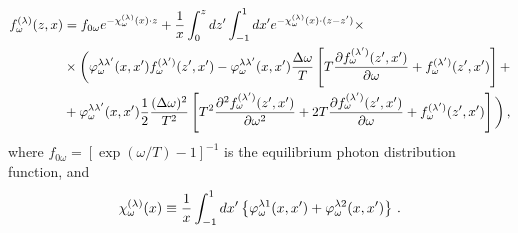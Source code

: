 \documentclass[
aps,%
12pt,%
final,%
notitlepage,%
oneside,%
onecolumn,%
nobibnotes,%
nofootinbib,%
superscriptaddress,%
noshowpacs,%
centertags]%
{revtex4}
\begin{document}
\begin{equation}\label{FormSol}
\begin{aligned}
f_\omega^{(\lambda)}(z,x)&=f_{0\omega} 	e^{-{\cal \chi}_\omega^{(\lambda)}(x)\cdot z} + \frac{1}{x}\int_{0}^{z}dz'\int_{-1}^{1}dx' e^{-{\cal \chi}_\omega^{(\lambda)}(x)\cdot (z-z')}\times
\\
&\times\bigg(\varphi_\omega^{\lambda 	\lambda'}(x,x')f_\omega^{(\lambda')}(z',x')- \varphi_\omega^{\lambda 	\lambda'}(x,x')\frac{\Delta \omega}{T}
\left[
T \frac{\partial f_\omega^{(\lambda')}(z',x')}{\partial \omega} + f_\omega^{(\lambda')}(z',x')
\right]+
\\
&+ \varphi_\omega^{\lambda 	\lambda'}(x,x')\frac{1}{2}\frac{(\Delta \omega)^2}{T^2}
\left[
T^2 \frac{\partial^2 f_\omega^{(\lambda')}(z',x')}{\partial \omega^2} + 2T \frac{\partial f_\omega^{(\lambda')}(z',x')}{\partial \omega}+f_\omega^{(\lambda')}(z',x')
\right]\bigg)\, ,
\end{aligned}	
\end{equation}
where $f_{0\omega}=[\exp(\omega/T)-1]^{-1}$ is the equilibrium photon distribution function, and
\begin{equation}
{\cal \chi}_\omega^{(\lambda)}(x) \equiv \frac{1}{x} \int_{-1}^{1} dx' \left\{\varphi^{\lambda 1}_\omega(x,x')+\varphi^{\lambda 2}_\omega(x,x')\right\}\, .
\end{equation}

\end{document}
